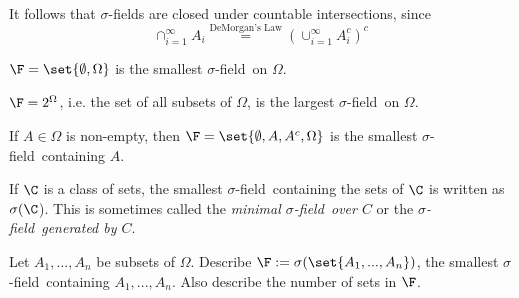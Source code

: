 \documentclass{article} %
\renewcommand{\sf}{$\sigma$-field}
\begin{document}
\begin{remark}
It follows that $\sigma$-fields are closed under countable intersections, since
\[ \cap_{i=1}^\infty A_i \stackrel{\text{DeMorgan's Law}}{=} (\cup_{i=1}^\infty A_i^c)^c \]	
\end{remark}

\begin{example}
$\F =\set{\emptyset, \Omega}$ is the smallest \sf\ on $\Omega$. 
\end{example}

\begin{example}
	$\F =2^\Omega$, i.e. the set of all subsets of $\Omega$, is the largest \sf\ on $\Omega$.
\label{ex:the_largest_sigma_field_is_the_power_set}
\end{example}

\begin{example}
If $A \in \Omega$ is non-empty, then $\F = \set{\emptyset, A, A^c, \Omega}$ is the smallest \sf\ containing $A$.
\end{example}

\begin{notation}
If $\C$ is a class of sets, the smallest \sf\ containing the sets of $\C$ is written as $\sigma(\C$).  This is sometimes called the \textit{minimal \sf\ over $C$} or the \textit{\sf\ generated by $C$}. 
\end{notation}
	
\begin{problem}{}
\label{prob:minimal_sigma_field_containing_n_subsets}
Let $A_1,...,A_n$ be subsets of $\Omega$.  Describe $\F := \sigma(\set{A_1,...,A_n})$, the smallest \sf\ containing $A_1,...,A_n$.  Also describe the number of sets in $\F$.    
\end{problem}
\end{document}
